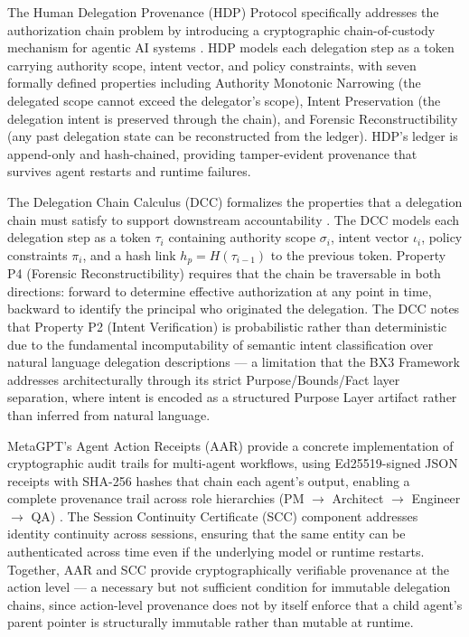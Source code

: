 The Human Delegation Provenance (HDP) Protocol specifically addresses the authorization chain problem by introducing a cryptographic chain-of-custody mechanism for agentic AI systems \cite{hdp2025ietf,hdp2026}. HDP models each delegation step as a token carrying authority scope, intent vector, and policy constraints, with seven formally defined properties including Authority Monotonic Narrowing (the delegated scope cannot exceed the delegator's scope), Intent Preservation (the delegation intent is preserved through the chain), and Forensic Reconstructibility (any past delegation state can be reconstructed from the ledger). HDP's ledger is append-only and hash-chained, providing tamper-evident provenance that survives agent restarts and runtime failures.

The Delegation Chain Calculus (DCC) formalizes the properties that a delegation chain must satisfy to support downstream accountability \cite{sentinel-agent2026}. The DCC models each delegation step as a token $\tau_i$ containing authority scope $\sigma_i$, intent vector $\iota_i$, policy constraints $\pi_i$, and a hash link $h_p = H(\tau_{i-1})$ to the previous token. Property P4 (Forensic Reconstructibility) requires that the chain be traversable in both directions: forward to determine effective authorization at any point in time, backward to identify the principal who originated the delegation. The DCC notes that Property P2 (Intent Verification) is probabilistic rather than deterministic due to the fundamental incomputability of semantic intent classification over natural language delegation descriptions \cite[Proposition 1]{sentinel-agent2026} — a limitation that the BX3 Framework addresses architecturally through its strict Purpose/Bounds/Fact layer separation, where intent is encoded as a structured Purpose Layer artifact rather than inferred from natural language.

MetaGPT's Agent Action Receipts (AAR) provide a concrete implementation of cryptographic audit trails for multi-agent workflows, using Ed25519-signed JSON receipts with SHA-256 hashes that chain each agent's output, enabling a complete provenance trail across role hierarchies (PM $\rightarrow$ Architect $\rightarrow$ Engineer $\rightarrow$ QA) \cite{metagpt-aar2025}. The Session Continuity Certificate (SCC) component addresses identity continuity across sessions, ensuring that the same entity can be authenticated across time even if the underlying model or runtime restarts. Together, AAR and SCC provide cryptographically verifiable provenance at the action level — a necessary but not sufficient condition for immutable delegation chains, since action-level provenance does not by itself enforce that a child agent's parent pointer is structurally immutable rather than mutable at runtime.

